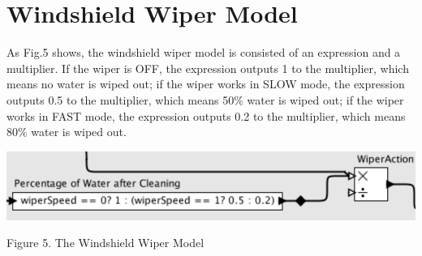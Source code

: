 \section{Windshield Wiper Model}
As Fig.5 shows,  the windshield wiper model is consisted of an expression and a multiplier. If the wiper is OFF, the expression outputs 1 to the multiplier, which means no water is wiped out; if the wiper works in SLOW mode, the expression outputs 0.5 to the multiplier, which means 50\% water is wiped out; if the wiper works in FAST mode, the expression outputs 0.2 to the multiplier, which means 80\% water is wiped out.

\begin{center}
\includegraphics[width=13.5cm]{fig5.png}
\end{center}
\begin{center}
\small{Figure 5. The Windshield Wiper Model}
\label{wiper}
\end{center}